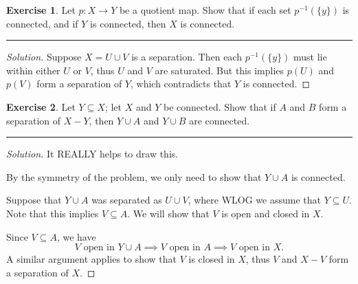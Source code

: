\documentclass{article}
\theoremstyle{definition}
\newtheorem{exercise}{Exercise}[section]
\begin{document}
\pagebreak

\begin{exercise}
  Let $p:X\to Y$ be a quotient map. Show that if each set $p^{-1}(\{y\})$ is connected, and if $Y$ is connected, then $X$ is connected.
\end{exercise}
\hrule
\begin{proof}[Solution]
  Suppose $X = U\cup V$ is a separation. Then each $p^{-1}(\{y\})$ must lie within either $U$ or $V$, thus $U$ and $V$ are saturated. But this implies $p(U)$ and $p(V)$ form a separation of $Y$, which contradicts that $Y$ is connected.
\end{proof}

\pagebreak

\begin{exercise}
  Let $Y\subseteq X$; let $X$ and $Y$ be connected. Show that if $A$ and $B$ form a separation of $X - Y$, then $Y\cup A$ and $Y\cup B$ are connected.
\end{exercise}
\hrule
\begin{proof}[Solution]
  It REALLY helps to draw this.

  By the symmetry of the problem, we only need to show that $Y\cup A$ is connected.

  Suppose that $Y\cup A$ was separated as $U\cup V$, where WLOG we assume that $Y\subseteq U$. Note that this implies $V \subseteq A$. We will show that $V$ is open and closed in $X$.

  Since $V\subseteq A$, we have
  $$V\text{ open in } Y\cup A \implies V\text{ open in } A \implies V\text{ open in } X.$$
  A similar argument applies to show that $V$ is closed in $X$, thus $V$ and $X - V$ form a separation of $X$.
\end{proof}

\pagebreak
\end{document}
